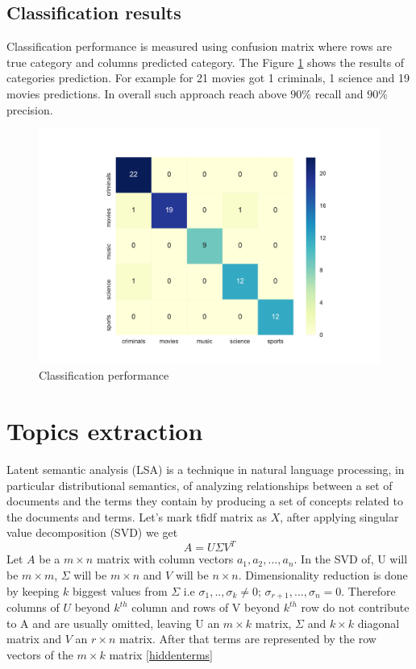 \documentclass{article}
\begin{document}
\subsection{Classification results}
Classification performance is measured using confusion matrix where rows are true category and columns predicted category. The  Figure \ref{confusion matrix} shows the results of categories prediction. For example  for 21 movies  got 1 criminals, 1 science and 19 movies predictions. In overall such approach reach above $90 \%$  recall and $90 \%$ precision.
\begin{figure}[H]
  \includegraphics[width=\linewidth]{images/confussion_matrix.pdf}
  \caption{Classification performance}
  \label{confusion matrix}
\end{figure}

\section{Topics extraction}
Latent semantic analysis (LSA) is a technique in natural language processing, in particular distributional semantics, of analyzing relationships between a set of documents and the terms they contain by producing a set of concepts related to the documents and terms. Let's mark tfidf matrix as $X$, after applying singular value decomposition (SVD) we get 
\begin{equation}
\label{LSA}
A =U\Sigma V^T
\end{equation}
Let $A$ be a $m \times n$ matrix with column vectors $a_1, a_2, ..., a_n$. In the SVD of, U will be $m \times m$, $\Sigma$ will be $m \times n$ and $V$ will be $n \times n$. Dimensionality reduction is done by keeping  $k$ biggest  values from $\Sigma$ i.e $\sigma_1,..,\sigma_k \neq 0$; $\sigma_{r+1},...,\sigma_n = 0$. Therefore columns of $U$ beyond $k^{th}$ column and rows of V beyond $k^{th}$ row do not contribute to A and are usually omitted, leaving U an  $m \times k$ matrix, $\Sigma$ and  $k \times k$ diagonal matrix and $V$ an  $r \times n$ matrix. After that terms are represented by the row vectors of the $m \times k$ matrix \ref{hiddenterms}
\end{document}
